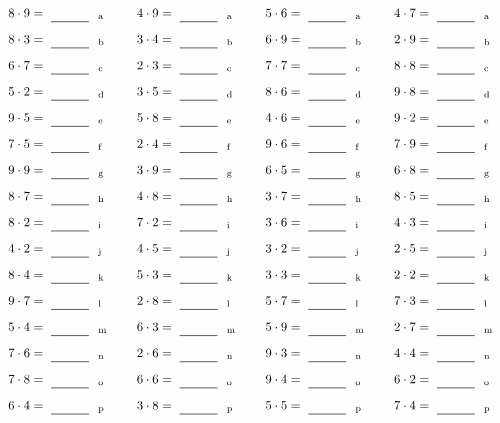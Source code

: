 \documentclass
[
  draft    = true,
  fontsize = 11pt,
  parskip  = half-
]
{scrartcl}
\begin{document}
\par\vfill\par
\begin{align*}
    \pline{8\cdot9}&=\rline{a}
  & \pline{4\cdot9}&=\rline{a}
  & \pline{5\cdot6}&=\rline{a}
  & \pline{4\cdot7}&=\rline{a} \\[1ex]
    \pline{8\cdot3}&=\rline{b}
  & \pline{3\cdot4}&=\rline{b}
  & \pline{6\cdot9}&=\rline{b}
  & \pline{2\cdot9}&=\rline{b} \\[1ex]
    \pline{6\cdot7}&=\rline{c}
  & \pline{2\cdot3}&=\rline{c}
  & \pline{7\cdot7}&=\rline{c}
  & \pline{8\cdot8}&=\rline{c} \\[1ex]
    \pline{5\cdot2}&=\rline{d}
  & \pline{3\cdot5}&=\rline{d}
  & \pline{8\cdot6}&=\rline{d}
  & \pline{9\cdot8}&=\rline{d} \\[1ex]
    \pline{9\cdot5}&=\rline{e}
  & \pline{5\cdot8}&=\rline{e}
  & \pline{4\cdot6}&=\rline{e}
  & \pline{9\cdot2}&=\rline{e} \\[1ex]
    \pline{7\cdot5}&=\rline{f}
  & \pline{2\cdot4}&=\rline{f}
  & \pline{9\cdot6}&=\rline{f}
  & \pline{7\cdot9}&=\rline{f} \\[1ex]
    \pline{9\cdot9}&=\rline{g}
  & \pline{3\cdot9}&=\rline{g}
  & \pline{6\cdot5}&=\rline{g}
  & \pline{6\cdot8}&=\rline{g} \\[1ex]
    \pline{8\cdot7}&=\rline{h}
  & \pline{4\cdot8}&=\rline{h}
  & \pline{3\cdot7}&=\rline{h}
  & \pline{8\cdot5}&=\rline{h} \\[1ex]
    \pline{8\cdot2}&=\rline{i}
  & \pline{7\cdot2}&=\rline{i}
  & \pline{3\cdot6}&=\rline{i}
  & \pline{4\cdot3}&=\rline{i} \\[1ex]
    \pline{4\cdot2}&=\rline{j}
  & \pline{4\cdot5}&=\rline{j}
  & \pline{3\cdot2}&=\rline{j}
  & \pline{2\cdot5}&=\rline{j} \\[1ex]
    \pline{8\cdot4}&=\rline{k}
  & \pline{5\cdot3}&=\rline{k}
  & \pline{3\cdot3}&=\rline{k}
  & \pline{2\cdot2}&=\rline{k} \\[1ex]
    \pline{9\cdot7}&=\rline{l}
  & \pline{2\cdot8}&=\rline{l}
  & \pline{5\cdot7}&=\rline{l}
  & \pline{7\cdot3}&=\rline{l} \\[1ex]
    \pline{5\cdot4}&=\rline{m}
  & \pline{6\cdot3}&=\rline{m}
  & \pline{5\cdot9}&=\rline{m}
  & \pline{2\cdot7}&=\rline{m} \\[1ex]
    \pline{7\cdot6}&=\rline{n}
  & \pline{2\cdot6}&=\rline{n}
  & \pline{9\cdot3}&=\rline{n}
  & \pline{4\cdot4}&=\rline{n} \\[1ex]
    \pline{7\cdot8}&=\rline{o}
  & \pline{6\cdot6}&=\rline{o}
  & \pline{9\cdot4}&=\rline{o}
  & \pline{6\cdot2}&=\rline{o} \\[1ex]
    \pline{6\cdot4}&=\rline{p}
  & \pline{3\cdot8}&=\rline{p}
  & \pline{5\cdot5}&=\rline{p}
  & \pline{7\cdot4}&=\rline{p}
\end{align*}
\end{document}
